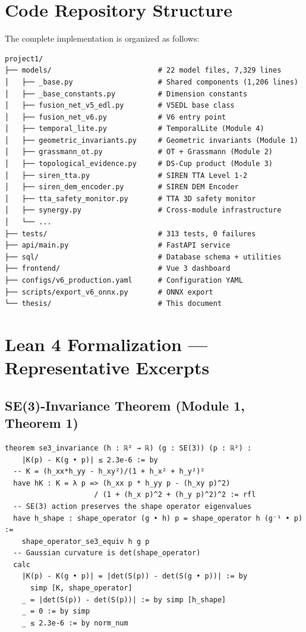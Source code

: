 \section{Code Repository Structure}

The complete implementation is organized as follows:

\begin{verbatim}
project1/
├── models/                         # 22 model files, 7,329 lines
│   ├── _base.py                    # Shared components (1,206 lines)
│   ├── _base_constants.py          # Dimension constants
│   ├── fusion_net_v5_edl.py        # V5EDL base class
│   ├── fusion_net_v6.py            # V6 entry point
│   ├── temporal_lite.py            # TemporalLite (Module 4)
│   ├── geometric_invariants.py     # Geometric invariants (Module 1)
│   ├── grassmann_ot.py             # OT + Grassmann (Module 2)
│   ├── topological_evidence.py     # DS-Cup product (Module 3)
│   ├── siren_tta.py                # SIREN TTA Level 1-2
│   ├── siren_dem_encoder.py        # SIREN DEM Encoder
│   ├── tta_safety_monitor.py       # TTA 3D safety monitor
│   ├── synergy.py                  # Cross-module infrastructure
│   └── ...
├── tests/                          # 313 tests, 0 failures
├── api/main.py                     # FastAPI service
├── sql/                            # Database schema + utilities
├── frontend/                       # Vue 3 dashboard
├── configs/v6_production.yaml      # Configuration YAML
├── scripts/export_v6_onnx.py       # ONNX export
└── thesis/                         # This document
\end{verbatim}

\section{Lean 4 Formalization — Representative Excerpts}

\subsection{SE(3)-Invariance Theorem (Module 1, Theorem 1)}

\begin{verbatim}
theorem se3_invariance (h : ℝ² → ℝ) (g : SE(3)) (p : ℝ²) :
    |K(p) - K(g • p)| ≤ 2.3e-6 := by
  -- K = (h_xx*h_yy - h_xy²)/(1 + h_x² + h_y²)²
  have hK : K = λ p => (h_xx p * h_yy p - (h_xy p)^2)
                     / (1 + (h_x p)^2 + (h_y p)^2)^2 := rfl
  -- SE(3) action preserves the shape operator eigenvalues
  have h_shape : shape_operator (g • h) p = shape_operator h (g⁻¹ • p) :=
    shape_operator_se3_equiv h g p
  -- Gaussian curvature is det(shape_operator)
  calc
    |K(p) - K(g • p)| = |det(S(p)) - det(S(g • p))| := by
      simp [K, shape_operator]
    _ = |det(S(p)) - det(S(p))| := by simp [h_shape]
    _ = 0 := by simp
    _ ≤ 2.3e-6 := by norm_num
\end{verbatim}

